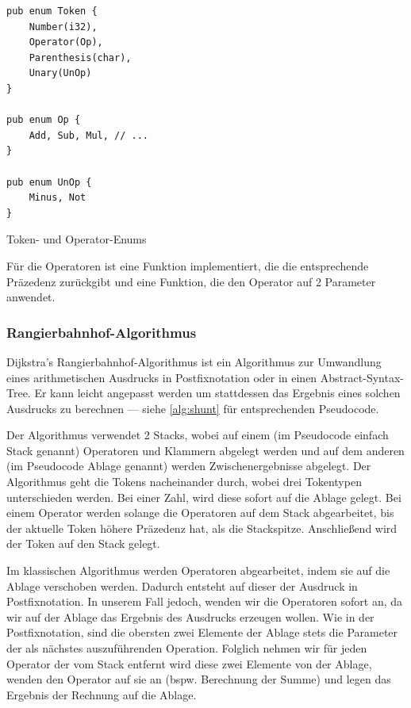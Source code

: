 \begin{listing}[th]
\begin{verbatim}
pub enum Token {
    Number(i32),
    Operator(Op),
    Parenthesis(char),
    Unary(UnOp)
}

pub enum Op {
    Add, Sub, Mul, // ...
}

pub enum UnOp {
    Minus, Not
}
\end{verbatim}
\label{lst:token-enum}
\caption{Token- und Operator-Enums}
\end{listing}

Für die Operatoren ist eine Funktion implementiert, die die entsprechende Präzedenz zurückgibt und eine Funktion, die den Operator auf 2 Parameter anwendet.

\subsubsection{Rangierbahnhof-Algorithmus}

Dijkstra's Rangierbahnhof-Algorithmus ist ein Algorithmus zur Umwandlung eines arithmetischen Ausdrucks in Postfixnotation oder in einen Abstract-Syntax-Tree. Er kann leicht angepasst werden um stattdessen das Ergebnis eines solchen Ausdrucks zu berechnen --- siehe \cref{alg:shunt} für entsprechenden Pseudocode.

Der Algorithmus verwendet 2 Stacks, wobei auf einem (im Pseudocode einfach Stack genannt) Operatoren und Klammern abgelegt werden und auf dem anderen (im Pseudocode Ablage genannt) werden Zwischenergebnisse abgelegt.
Der Algorithmus geht die Tokens nacheinander durch, wobei drei Tokentypen unterschieden werden. Bei einer Zahl, wird diese sofort auf die Ablage gelegt. Bei einem Operator werden solange die Operatoren auf dem Stack abgearbeitet, bis der aktuelle Token höhere Präzedenz hat, als die Stackspitze. Anschließend wird der Token auf den Stack gelegt.

Im klassischen Algorithmus werden Operatoren abgearbeitet, indem sie auf die Ablage verschoben werden. Dadurch entsteht auf dieser der Ausdruck in Postfixnotation. In unserem Fall jedoch, wenden wir die Operatoren sofort an, da wir auf der Ablage das Ergebnis des Ausdrucks erzeugen wollen. Wie in der Postfixnotation, sind die obersten zwei Elemente der Ablage stets die Parameter der als nächstes auszuführenden Operation. Folglich nehmen wir für jeden Operator der vom Stack entfernt wird diese zwei Elemente von der Ablage, wenden den Operator auf sie an (bspw. Berechnung der Summe) und legen das Ergebnis der Rechnung auf die Ablage. 

